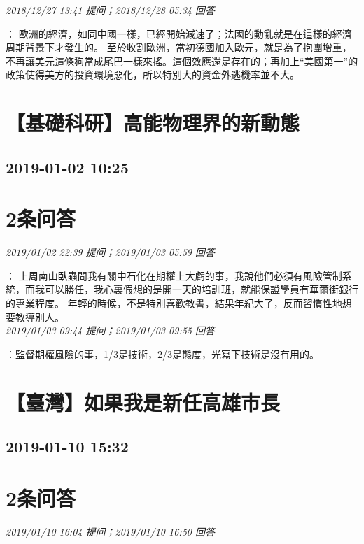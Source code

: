 \documentclass[twocolumn]{ctexart}
\begin{document}
\textit{\hfill\noindent\small 2018/12/27 13:41 提问；2018/12/28 05:34 回答}

：
歐洲的經濟，如同中國一樣，已經開始減速了；法國的動亂就是在這樣的經濟周期背景下才發生的。
至於收割歐洲，當初德國加入歐元，就是為了抱團增重，不再讓美元這條狗當成尾巴一樣來搖。這個效應還是存在的；再加上“美國第一”的政策使得美方的投資環境惡化，所以特別大的資金外逃機率並不大。
\\


\section{【基礎科研】高能物理界的新動態}
\subsection{2019-01-02 10:25}


\section{2条问答}

\textit{\hfill\noindent\small 2019/01/02 22:39 提问；2019/01/03 05:59 回答}

：
上周南山臥蟲問我有關中石化在期權上大虧的事，我說他們必須有風險管制系統，而我可以勝任，我心裏假想的是開一天的培訓班，就能保證學員有華爾街銀行的專業程度。
年輕的時候，不是特別喜歡教書，結果年紀大了，反而習慣性地想要教導別人。
\\

\textit{\hfill\noindent\small 2019/01/03 09:44 提问；2019/01/03 09:55 回答}

：監督期權風險的事，1/3是技術，2/3是態度，光寫下技術是沒有用的。
\\


\section{【臺灣】如果我是新任高雄市長}
\subsection{2019-01-10 15:32}


\section{2条问答}

\textit{\hfill\noindent\small 2019/01/10 16:04 提问；2019/01/10 16:50 回答}
\end{document}
